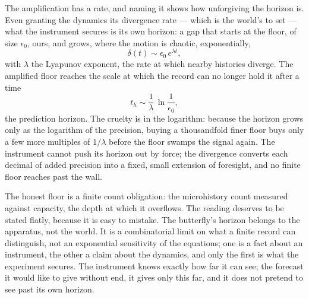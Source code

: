 The amplification has a rate, and naming it shows how unforgiving the horizon is. Even granting the dynamics
its divergence rate --- which is the world's to set --- what the instrument secures is its own horizon: a gap
that starts at the floor, of size $\epsilon_0$, ours, and grows, where the motion is chaotic, exponentially,
\begin{equation}
  \delta(t) \sim \epsilon_0\, e^{\lambda t},
\end{equation}
with $\lambda$ the Lyapunov exponent, the rate at which nearby histories diverge. The amplified floor reaches
the scale at which the record can no longer hold it after a time
\begin{equation}
  t_h \sim \frac{1}{\lambda}\,\ln\frac{1}{\epsilon_0},
\end{equation}
the prediction horizon. The cruelty is in the logarithm: because the horizon grows only as the logarithm of
the precision, buying a thousandfold finer floor buys only a few more multiples of $1/\lambda$ before the
floor swamps the signal again. The instrument cannot push its horizon out by force; the divergence converts
each decimal of added precision into a fixed, small extension of foresight, and no finite floor reaches past
the wall.

The honest floor is a finite count obligation: the microhistory count measured against capacity, the depth at
which it overflows. The reading deserves to be stated flatly, because it is easy to mistake. The butterfly's
horizon belongs to the apparatus, not the world. It is a combinatorial limit on what a finite record can
distinguish, not an exponential sensitivity of the equations; one is a fact about an instrument, the other a
claim about the dynamics, and only the first is what the experiment secures. The instrument knows exactly how
far it can see; the forecast it would like to give without end, it gives only this far, and it does not pretend
to see past its own horizon.

\bigskip

